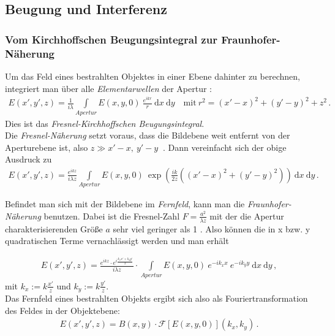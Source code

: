 \documentclass[12pt,a4paper,titlepage,headinclude,bibtotoc]{scrartcl}
\newcommand{\dif}{\ensuremath{\mathrm{d}}}
\begin{document}
\subsection{Beugung und Interferenz}

\subsubsection{Vom Kirchhoffschen Beugungsintegral zur Fraunhofer-Näherung}
Um das Feld eines bestrahlten Objektes in einer Ebene dahinter zu berechnen, integriert man über alle \emph{Elementarwellen} der Apertur \cite[S.67]{optik}:
\begin{align}
	E(x',y',z)=\frac{1}{i \lambda} \int \limits _{Apertur} E(x,y,0) ~ \frac{e^{ikr}}{r}~\dif x ~\dif y \quad \text{mit} ~ r^2=(x'-x)^2+(y'-y)^2+z^2 \,.
	\label{eq:Beugungsintegral}
\end{align}
Dies ist das \emph{Fresnel-Kirchhoffschen Beugungsintegral}.\\

Die \emph{Fresnel-Näherung} setzt voraus, dass die Bildebene weit entfernt von der Aperturebene ist, also $z \gg x'-x,~y'-y~$ \cite[S.68]{optik}.
Dann vereinfacht sich der obige Ausdruck zu
\begin{align}
	E(x',y',z)=\frac{e^{ikz}}{i \lambda z} \int \limits _{Apertur} E(x,y,0) ~ \exp\left(\frac{ik}{2z}\left((x'-x)^2+(y'-y)^2\right)\right) ~\dif x ~\dif y\,.
	\label{eq:Fresnel}
\end{align}

Befindet man sich mit der Bildebene im \emph{Fernfeld}, kann man die \emph{Fraunhofer-Näherung} benutzen.
Dabei ist die Fresnel-Zahl $F=\frac{a^2}{\lambda z}$ mit der die Apertur charakterisierenden Größe $a$ sehr viel geringer als 1 \cite[S.68f.]{optik}.
Also können die in x bzw. y quadratischen Terme vernachlässigt werden und man erhält

\begin{align}
	E(x',y',z)=\frac{e^{ikz} \cdot e^{i \frac{k_xx'+k_yy'}{2}}}{i \lambda z}\cdot \int \limits _{Apertur} E(x,y,0)~ e^{-ik_xx} ~ e^{-ik_yy} ~\dif x~ \dif y \,,
	\label{eq:Fraunhofer1}
\end{align}
mit $k_x:= k\frac{x'}{z}$ und  $k_y:= k\frac{y'}{z}$.\\

Das Fernfeld eines bestrahlten Objekts ergibt sich also als Fouriertransformation des Feldes in der Objektebene:
\begin{align}
	E(x',y',z)=B(x,y)\cdot \mathcal{F}\left[E(x,y,0)
	\right](k_x,k_y) \,.
	\label{eq:Fraunhofer2}
\end{align}
\end{document}
